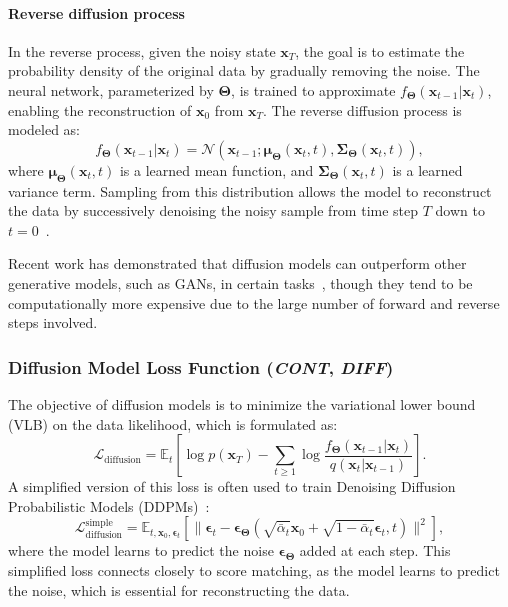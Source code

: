 \documentclass[sn-mathphys-num]{sn-jnl}%
\newcommand \cont{\textit{CONT}}
\newcommand \diff{\textit{DIFF}}
\renewcommand\vec{\mathbf}
\begin{document}
\paragraph{Reverse diffusion process}
In the reverse process, given the noisy state $\mathbf{x}_T$, the goal is to estimate the probability density of the original data by gradually removing the noise. The neural network, parameterized by $\vec{\Theta}$, is trained to approximate $f_\vec{\Theta}(\mathbf{x}_{t-1} \vert \mathbf{x}_t)$, enabling the reconstruction of $\mathbf{x}_{0}$ from $\mathbf{x}_T$. The reverse diffusion process is modeled as:
\begin{equation}
    f_\vec{\Theta}(\mathbf{x}_{t-1} \vert \mathbf{x}_t) = \mathcal{N}(\mathbf{x}_{t-1}; \boldsymbol{\mu}_\vec{\Theta}(\mathbf{x}_t, t), \boldsymbol{\Sigma}_\vec{\Theta}(\mathbf{x}_t, t)),
\end{equation}
where $\boldsymbol{\mu}_\vec{\Theta}(\mathbf{x}_t, t)$ is a learned mean function, and $\boldsymbol{\Sigma}_\vec{\Theta}(\mathbf{x}_t, t)$ is a learned variance term. Sampling from this distribution allows the model to reconstruct the data by successively denoising the noisy sample from time step $T$ down to $t = 0$~\cite{ho2020denoising}.

Recent work has demonstrated that diffusion models can outperform other generative models, such as GANs, in certain tasks~\cite{dhariwal2021diffusion,song2020improved}, though they tend to be computationally more expensive due to the large number of forward and reverse steps involved.

\subsubsection{Diffusion Model Loss Function (\cont, \diff)}
The objective of diffusion models is to minimize the variational lower bound (VLB) on the data likelihood, which is formulated as:
\begin{equation}
    \mathcal{L}_{\text{diffusion}} = \mathbb{E}_t \left[\log p(\mathbf{x}_T) - \sum_{t \geq 1} \log \frac{f_\vec{\Theta}(\mathbf{x}_{t-1}|\mathbf{x}_t)}{q(\mathbf{x}_t|\mathbf{x}_{t-1})}\right].
\end{equation}
A simplified version of this loss is often used to train Denoising Diffusion Probabilistic Models (DDPMs)~\cite{ho2020denoising}:
\begin{equation}
    \mathcal{L}_{\text{diffusion}}^\text{simple} = \mathbb{E}_{t, \mathbf{x}_0, \boldsymbol{\epsilon}_t} \left[\|\boldsymbol{\epsilon}_t - \boldsymbol{\epsilon}_\vec{\Theta}(\sqrt{\bar{\alpha}_t} \mathbf{x}_0 + \sqrt{1 - \bar{\alpha}_t} \boldsymbol{\epsilon}_t, t)\|^2 \right],
\end{equation}
where the model learns to predict the noise $\boldsymbol{\epsilon}_\vec{\Theta}$ added at each step. This simplified loss connects closely to score matching, as the model learns to predict the noise, which is essential for reconstructing the data.
\end{document}
